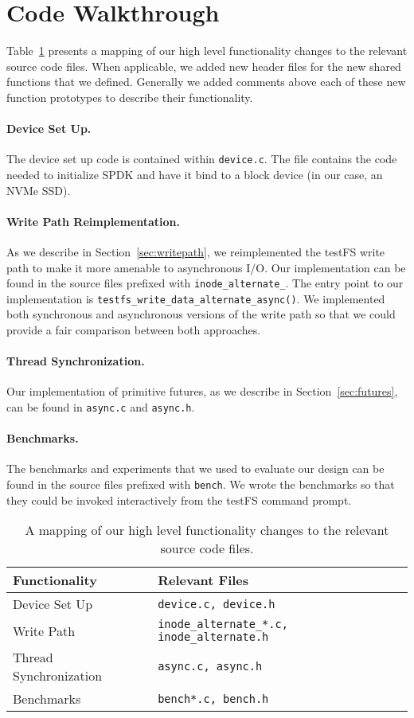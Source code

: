 \section{Code Walkthrough}\label{apx:codewalkthrough}
Table~\ref{tbl:codemap} presents a mapping of our high level functionality
changes to the relevant source code files. When applicable, we added new header
files for the new shared functions that we defined. Generally we added comments
above each of these new function prototypes to describe their functionality.

\paragraph{Device Set Up.}
The device set up code is contained within {\tt device.c}. The file contains
the code needed to initialize SPDK and have it bind to a block device (in our
case, an NVMe SSD).

\paragraph{Write Path Reimplementation.}
As we describe in Section~\ref{sec:writepath}, we reimplemented the testFS
write path to make it more amenable to asynchronous I/O. Our implementation can
be found in the source files prefixed with {\tt inode\_alternate\_}. The entry
point to our implementation is {\tt testfs\_write\_data\_alternate\_async()}.
We implemented both synchronous and asynchronous versions of the write path so
that we could provide a fair comparison between both approaches.

\paragraph{Thread Synchronization.}
Our implementation of primitive futures, as we describe in
Section~\ref{sec:futures}, can be found in {\tt async.c} and {\tt async.h}.

\paragraph{Benchmarks.}
The benchmarks and experiments that we used to evaluate our design can be found
in the source files prefixed with {\tt bench}. We wrote the benchmarks so that
they could be invoked interactively from the testFS command prompt.

\begin{table}[h!]
  \centering
  \caption{A mapping of our high level functionality changes to the relevant
    source code files.}\label{tbl:codemap}
  \begin{tabular}{p{2cm}|p{4cm}}
    {\bf Functionality} & {\bf Relevant Files} \\ \hline
    Device Set Up & {\tt device.c, device.h} \\ \hline
    Write Path & {\tt inode\_alternate\_*.c, inode\_alternate.h} \\ \hline
    Thread Synchronization & {\tt async.c, async.h} \\ \hline
    Benchmarks & {\tt bench*.c, bench.h}
  \end{tabular}
\end{table}
